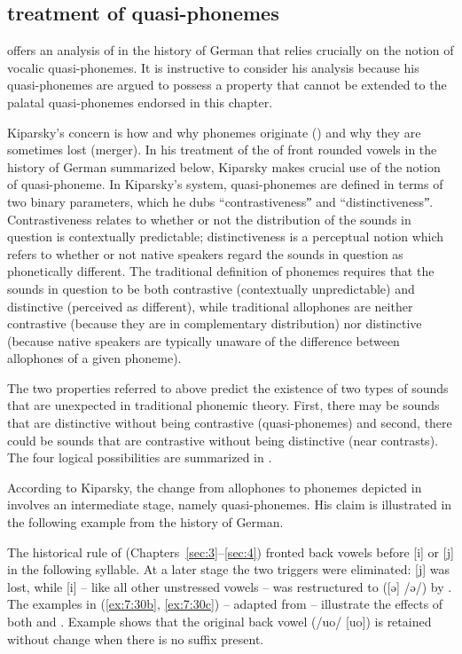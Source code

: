\subsection{ treatment of quasi-phonemes}\label{sec:7.4.4}

\citet{Kiparsky2015} offers an analysis of  in the history of German that relies crucially on the notion of vocalic quasi-phonemes. It is instructive to consider his analysis because his quasi-phonemes are argued to possess a property that cannot be extended to the palatal quasi-phonemes endorsed in this chapter.

Kiparsky’s concern is how and why phonemes originate () and why they are sometimes lost (merger). In his treatment of the  of front rounded vowels in the history of German summarized below, Kiparsky makes crucial use of the notion of quasi-phoneme. In Kiparsky’s system, quasi-phonemes are defined in terms of two binary parameters, which he dubs “contrastivenessˮ and “distinctivenessˮ. Contrastiveness relates to whether or not the distribution of the sounds in question is contextually predictable; distinctiveness is a perceptual notion which refers to whether or not native speakers regard the sounds in question as phonetically different. The traditional definition of phonemes requires that the sounds in question to be both contrastive (contextually unpredictable) and distinctive (perceived as different), while traditional allophones are neither contrastive (because they are in complementary distribution) nor distinctive (because native speakers are typically unaware of the difference between allophones of a given phoneme).

The two properties referred to above predict the existence of two types of sounds that are unexpected in traditional phonemic theory. First, there may be sounds that are distinctive without being contrastive (quasi-phonemes) and second, there could be sounds that are contrastive without being distinctive (near contrasts). The four logical possibilities are summarized in .

According to Kiparsky, the change from allophones to phonemes depicted in  involves an intermediate stage, namely quasi-phonemes. His claim is illustrated in the following example from the history of German.

The historical rule of  (Chapters~\ref{sec:3}--\ref{sec:4}) fronted back vowels before [i] or [j] in the following syllable. At a later stage the two triggers were eliminated: [j] was lost, while [i] -- like all other unstressed vowels -- was restructured to  ([ə] /ə/) by . The examples in (\ref{ex:7:30b}, \ref{ex:7:30c}) -- adapted from \citet{Kiparsky2015} -- illustrate the effects of both  and . Example  shows that the original back vowel (/uo/ [uo]) is retained without change when there is no suffix present.


